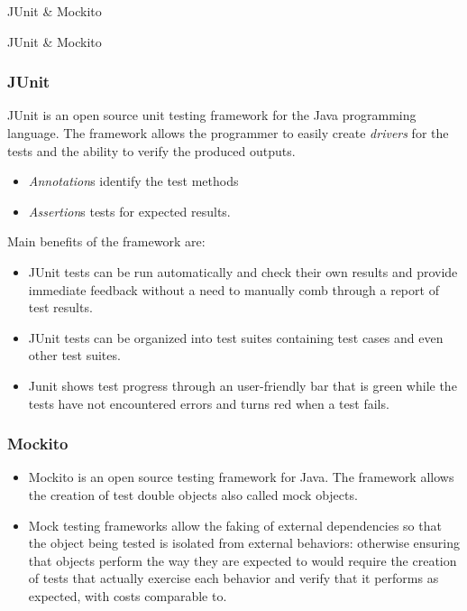 \documentclass{beamer}
\begin{document}
\begin{section}{JUnit \& Mockito}
	\begin{subsection}{JUnit \& Mockito}
		
		\begin{frame}
			
			\frametitle{JUnit}
			{\small 
				JUnit is an open source unit testing framework for the Java programming language.
				The framework allows the programmer to easily create \textit{drivers} for the tests and the ability to verify the produced outputs. 
				\begin{itemize}
					
					\item \textit{Annotation}s identify the test methods 
					\item \textit{Assertion}s tests for expected results.
					
				\end{itemize}
				Main benefits of the framework are: \begin{itemize}
					\item JUnit tests can be run automatically and check their own results and provide immediate feedback without a need to manually comb through a report of test results.
					
					\item JUnit tests can be organized into test suites containing test cases and even other test suites.
					
					\item Junit shows test progress through an user-friendly bar that is green while the tests have not encountered errors and turns red when a test fails.
					
				\end{itemize}}
			\end{frame}
			\begin{frame}
				\frametitle{Mockito}
				\begin{itemize}
			\item Mockito is an open source testing framework for Java. The framework allows the creation of test double objects also called mock objects.
					
			\item Mock testing frameworks allow the faking of external dependencies so that the object being tested is isolated from external behaviors: otherwise ensuring that objects perform the way they are expected to would require the creation of tests that actually exercise each behavior and verify that it performs as expected, with costs comparable to.
				\end{itemize}
				\end{frame}
				

\end{subsection}
\end{section}
\end{document}
